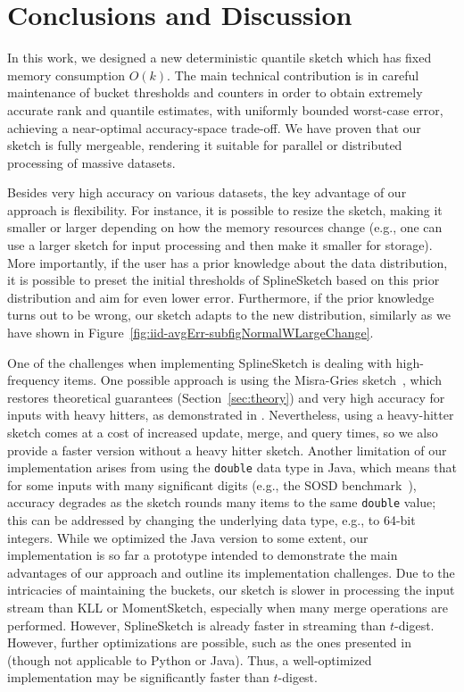 \documentclass[acmsmall]{acmart}
\theoremstyle{remark}
\begin{document}
\section{Conclusions and Discussion}\label{sec:conclusions}

In this work, we designed a new deterministic quantile sketch which has fixed memory consumption $O(k)$.
The main technical contribution is in careful maintenance of bucket thresholds and counters 
in order to obtain extremely accurate rank and quantile estimates, with uniformly bounded worst-case error,
achieving a near-optimal accuracy-space trade-off.
We have proven that our sketch is fully mergeable, rendering it suitable for parallel or distributed processing of massive datasets.

Besides very high accuracy on various datasets, the key advantage of our approach is flexibility.
For instance, it is possible to resize the sketch, making it smaller or larger depending on how the memory resources change
(e.g., one can use a larger sketch for input processing and then make it smaller for storage).
More importantly, if the user has a prior knowledge about the data distribution, 
it is possible to preset the initial thresholds of SplineSketch based on this prior distribution
and aim for even lower error.
Furthermore,  if the prior knowledge turns out to be wrong, our sketch adapts to the new distribution,
similarly as we have shown in Figure~\ref{fig:iid-avgErr-subfigNormalWLargeChange}.


One of the challenges when implementing SplineSketch is dealing with high-frequency items.
One possible approach is using the Misra-Gries sketch~\cite{misra1982finding}, which
	restores theoretical guarantees (Section~\ref{sec:theory})
	and very high accuracy for inputs with heavy hitters, as demonstrated in .
Nevertheless, using a heavy-hitter sketch comes at a cost of increased update, merge, and query times,
so we also provide a faster version without a heavy hitter sketch.
Another limitation of our implementation arises from using the \texttt{double} data type in Java,
which means that for some inputs with many significant digits (e.g., the SOSD benchmark~\cite{sosd,MarcusKRSMK0K20sosd}), accuracy degrades as the sketch rounds many items to the same \texttt{double} value;
this can be addressed by changing the underlying data type, e.g., to 64-bit integers.
While we optimized the Java version to some extent,
our implementation is so far a prototype %
intended to demonstrate the main advantages of our approach and outline its implementation challenges.
Due to the intricacies of maintaining the buckets, our sketch is slower in processing the input stream than KLL or MomentSketch,
especially when many merge operations are performed.
However, SplineSketch is already faster in streaming than $t$-digest.
However, further optimizations are possible, such as the ones presented in \cite{pfeil.etal:2025:proc.21stint.workshopdatamanag.newhardw.} (though not applicable to Python or Java).
Thus, a well-optimized implementation may be significantly faster than $t$-digest.
\end{document}

